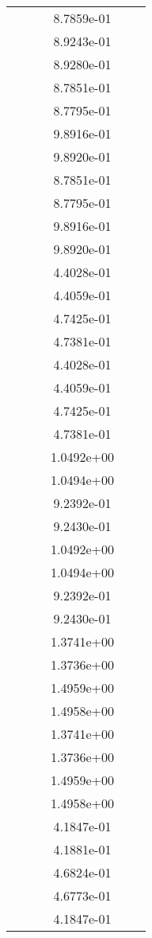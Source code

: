 \begin{xltabular}{\textwidth}{r|rS[table-format=1.3e+2]S[table-format=1.4e+2]S[table-format=1.4e+2]S[table-format=-1.5]}
&  &  & 8.7859e-01 & & \\
&  &  & 8.9243e-01 & & \\
&  &  & 8.9280e-01 & & \\
&  &  & 8.7851e-01 & & \\
&  &  & 8.7795e-01 & & \\
&  &  & 9.8916e-01 & & \\
&  &  & 9.8920e-01 & & \\
&  &  & 8.7851e-01 & & \\
&  &  & 8.7795e-01 & & \\
&  &  & 9.8916e-01 & & \\
&  &  & 9.8920e-01 & & \\
&  &  & 4.4028e-01 & & \\
&  &  & 4.4059e-01 & & \\
&  &  & 4.7425e-01 & & \\
&  &  & 4.7381e-01 & & \\
&  &  & 4.4028e-01 & & \\
&  &  & 4.4059e-01 & & \\
&  &  & 4.7425e-01 & & \\
&  &  & 4.7381e-01 & & \\
&  &  & 1.0492e+00 & & \\
&  &  & 1.0494e+00 & & \\
&  &  & 9.2392e-01 & & \\
&  &  & 9.2430e-01 & & \\
&  &  & 1.0492e+00 & & \\
&  &  & 1.0494e+00 & & \\
&  &  & 9.2392e-01 & & \\
&  &  & 9.2430e-01 & & \\
&  &  & 1.3741e+00 & & \\
&  &  & 1.3736e+00 & & \\
&  &  & 1.4959e+00 & & \\
&  &  & 1.4958e+00 & & \\
&  &  & 1.3741e+00 & & \\
&  &  & 1.3736e+00 & & \\
&  &  & 1.4959e+00 & & \\
&  &  & 1.4958e+00 & & \\
&  &  & 4.1847e-01 & & \\
&  &  & 4.1881e-01 & & \\
&  &  & 4.6824e-01 & & \\
&  &  & 4.6773e-01 & & \\
&  &  & 4.1847e-01 & & \\

\end{xltabular}
